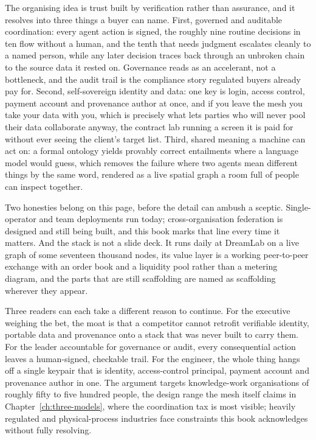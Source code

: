 The organising idea is trust built by verification rather than assurance, and it resolves into three things a buyer can name. First, governed and auditable coordination: every agent action is signed, the roughly nine routine decisions in ten flow without a human, and the tenth that needs judgment escalates cleanly to a named person, while any later decision traces back through an unbroken chain to the source data it rested on. Governance reads as an accelerant, not a bottleneck, and the audit trail is the compliance story regulated buyers already pay for. Second, self-sovereign identity and data: one key is login, access control, payment account and provenance author at once, and if you leave the mesh you take your data with you, which is precisely what lets parties who will never pool their data collaborate anyway, the contract lab running a screen it is paid for without ever seeing the client's target list. Third, shared meaning a machine can act on: a formal ontology yields provably correct entailments where a language model would guess, which removes the failure where two agents mean different things by the same word, rendered as a live spatial graph a room full of people can inspect together.

Two honesties belong on this page, before the detail can ambush a sceptic. Single-operator and team deployments run today; cross-organisation federation is designed and still being built, and this book marks that line every time it matters. And the stack is not a slide deck. It runs daily at DreamLab on a live graph of some seventeen thousand nodes, its value layer is a working peer-to-peer exchange with an order book and a liquidity pool rather than a metering diagram, and the parts that are still scaffolding are named as scaffolding wherever they appear.

Three readers can each take a different reason to continue. For the executive weighing the bet, the moat is that a competitor cannot retrofit verifiable identity, portable data and provenance onto a stack that was never built to carry them. For the leader accountable for governance or audit, every consequential action leaves a human-signed, checkable trail. For the engineer, the whole thing hangs off a single keypair that is identity, access-control principal, payment account and provenance author in one. The argument targets knowledge-work organisations of roughly fifty to five hundred people, the design range the mesh itself claims in Chapter~\ref{ch:three-models}, where the coordination tax is most visible; heavily regulated and physical-process industries face constraints this book acknowledges without fully resolving.


